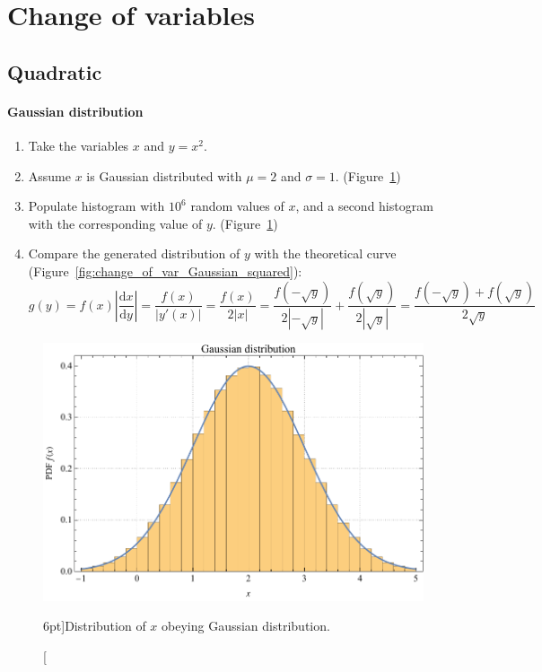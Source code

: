 

\section{Change of variables}
\label{exer:change_of_var}

\subsection{Quadratic}
\label{exer:change_of_var_quadratic}

\paragraph{Gaussian distribution}

\begin{enumerate}
	\item Take the variables $x$ and $y = x^{2}$.
	\item Assume $x$ is Gaussian distributed with $\mu = 2$ and $\sigma = 1$. (Figure~\ref{fig:change_of_var_Gaussian})
	\item Populate histogram with $10^{6}$ random values of $x$, and a second histogram with the corresponding value of $y$. (Figure~\ref{fig:change_of_var_Gaussian})
	\item Compare the generated distribution of $y$ with the theoretical curve (Figure~\ref{fig:change_of_var_Gaussian_squared}):
		$$
		g(y) = f(x) \left| \frac{\mathrm{d}x}{\mathrm{d}y} \right| 
		= \frac{f(x)}{\left| y'(x) \right|} 
		= \frac{f(x)}{2 \left| x \right|} 
		= \frac{f(-\sqrt{y})}{2 \left| -\sqrt{y} \right|} + \frac{f(\sqrt{y})}{2 \left| \sqrt{y} \right|} 
		= \frac{f(-\sqrt{y}) + f(\sqrt{y})}{2 \sqrt{y}}
		$$
\end{enumerate}

\begin{figure}
	\includegraphics{exercise/change_of_var_Gaussian.pdf}
	\caption[Distribution of $x$ obeying Gaussian distribution.][6pt]{Distribution of $x$ obeying Gaussian distribution.}
	\label{fig:change_of_var_Gaussian}
\end{figure}

